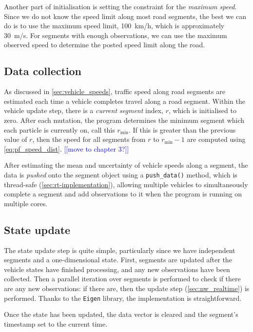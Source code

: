 Another part of initialisation is setting the constraint for the \emph{maximum speed}. Since we do not know the speed limit along most road segments, the best we can do is to use the maximum speed limit, 100~km/h, which is approximately 30~m/s. For segments with enough observations, we can use the maximum observed speed to determine the posted speed limit along the road.


\subsection{Data collection}
\label{sec:nw_implementation_data}

As discussed in \cref{sec:vehicle_speeds}, traffic speed along road segments are estimated each time a vehicle completes travel along a road segment. Within the vehicle update step, there is a \emph{current segment} index, $r$, which is initialised to zero. After each mutation, the program determines the minimum segment which each particle is currently on, call this $r_{\text{min}}$. If this is greater than the previous value of $r$, then the speed for all segments from $r$ to $r_{\text{min}}-1$ are computed using \cref{eq:pf_speed_dist}.
\textcolor{blue}{[[move to chapter 3?]]}


After estimating the mean and uncertainty of vehicle speeds along a segment, the data is \emph{pushed} onto the segment object using a \verb+push_data()+ method, which is thread-safe (\cref{sec:rt-implementation}), allowing multiple vehicles to simultaneously complete a segment and add observations to it when the program is running on multiple cores.



\subsection{State update}
\label{sec:nw_implementation_update}

The state update step is quite simple, particularly since we have independent segments and a one-dimensional state. First, segments are updated after the vehicle states have finished processing, and any new observations have been collected. Then a parallel iteration over segments is performed to check if there are any new observations: if there are, then the update step (\cref{sec:nw_realtime}) is performed. Thanks to the \verb+Eigen+ library, the implementation is straightforward.

Once the state has been updated, the data vector is cleared and the segment's timestamp set to the current time.


